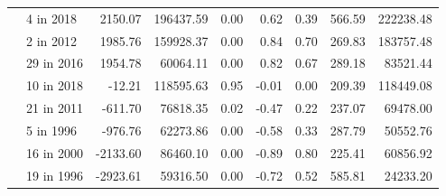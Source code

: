 \begin{tabular}{llrrrrrrr}
   & 4 in 2018 &                                     2150.07 &                                       196437.59 &                                          0.00 &                                               0.62 &                                        0.39 &                                             566.59 &                                        222238.48 \\
   & 2 in 2012 &                                     1985.76 &                                       159928.37 &                                          0.00 &                                               0.84 &                                        0.70 &                                             269.83 &                                        183757.48 \\
   & 29 in 2016 &                                     1954.78 &                                        60064.11 &                                          0.00 &                                               0.82 &                                        0.67 &                                             289.18 &                                         83521.44 \\
   & 10 in 2018 &                                      -12.21 &                                       118595.63 &                                          0.95 &                                              -0.01 &                                        0.00 &                                             209.39 &                                        118449.08 \\
   & 21 in 2011 &                                     -611.70 &                                        76818.35 &                                          0.02 &                                              -0.47 &                                        0.22 &                                             237.07 &                                         69478.00 \\
   & 5 in 1996 &                                     -976.76 &                                        62273.86 &                                          0.00 &                                              -0.58 &                                        0.33 &                                             287.79 &                                         50552.76 \\
   & 16 in 2000 &                                    -2133.60 &                                        86460.10 &                                          0.00 &                                              -0.89 &                                        0.80 &                                             225.41 &                                         60856.92 \\
   & 19 in 1996 &                                    -2923.61 &                                        59316.50 &                                          0.00 &                                              -0.72 &                                        0.52 &                                             585.81 &                                         24233.20 \\
\bottomrule
\end{tabular}
